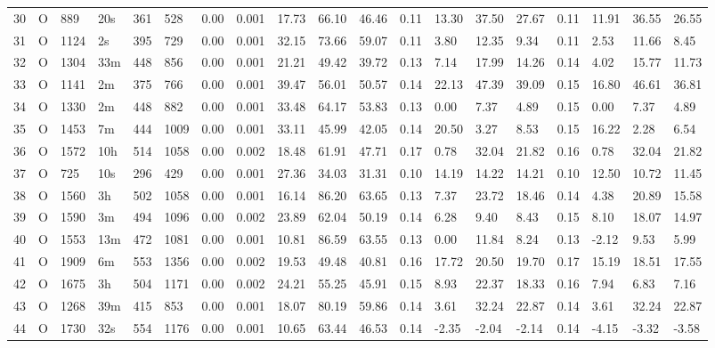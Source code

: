 \begin{tabular}{rllllllrlllllllllll}
30 & O & 889 & 20s & 361 & 528 & 0.00 & 0.001 & 17.73 & 66.10 & 46.46 & 0.11 & 13.30 & 37.50 & 27.67 & 0.11 & 11.91 & 36.55 & 26.55 \\
31 & O & 1124 & 2s & 395 & 729 & 0.00 & 0.001 & 32.15 & 73.66 & 59.07 & 0.11 & 3.80 & 12.35 & 9.34 & 0.11 & 2.53 & 11.66 & 8.45 \\
32 & O & 1304 & 33m & 448 & 856 & 0.00 & 0.001 & 21.21 & 49.42 & 39.72 & 0.13 & 7.14 & 17.99 & 14.26 & 0.14 & 4.02 & 15.77 & 11.73 \\
33 & O & 1141 & 2m & 375 & 766 & 0.00 & 0.001 & 39.47 & 56.01 & 50.57 & 0.14 & 22.13 & 47.39 & 39.09 & 0.15 & 16.80 & 46.61 & 36.81 \\
34 & O & 1330 & 2m & 448 & 882 & 0.00 & 0.001 & 33.48 & 64.17 & 53.83 & 0.13 & 0.00 & 7.37 & 4.89 & 0.15 & 0.00 & 7.37 & 4.89 \\
35 & O & 1453 & 7m & 444 & 1009 & 0.00 & 0.001 & 33.11 & 45.99 & 42.05 & 0.14 & 20.50 & 3.27 & 8.53 & 0.15 & 16.22 & 2.28 & 6.54 \\
36 & O & 1572 & 10h & 514 & 1058 & 0.00 & 0.002 & 18.48 & 61.91 & 47.71 & 0.17 & 0.78 & 32.04 & 21.82 & 0.16 & 0.78 & 32.04 & 21.82 \\
37 & O & 725 & 10s & 296 & 429 & 0.00 & 0.001 & 27.36 & 34.03 & 31.31 & 0.10 & 14.19 & 14.22 & 14.21 & 0.10 & 12.50 & 10.72 & 11.45 \\
38 & O & 1560 & 3h & 502 & 1058 & 0.00 & 0.001 & 16.14 & 86.20 & 63.65 & 0.13 & 7.37 & 23.72 & 18.46 & 0.14 & 4.38 & 20.89 & 15.58 \\
39 & O & 1590 & 3m & 494 & 1096 & 0.00 & 0.002 & 23.89 & 62.04 & 50.19 & 0.14 & 6.28 & 9.40 & 8.43 & 0.15 & 8.10 & 18.07 & 14.97 \\
40 & O & 1553 & 13m & 472 & 1081 & 0.00 & 0.001 & 10.81 & 86.59 & 63.55 & 0.13 & 0.00 & 11.84 & 8.24 & 0.13 & -2.12 & 9.53 & 5.99 \\
41 & O & 1909 & 6m & 553 & 1356 & 0.00 & 0.002 & 19.53 & 49.48 & 40.81 & 0.16 & 17.72 & 20.50 & 19.70 & 0.17 & 15.19 & 18.51 & 17.55 \\
42 & O & 1675 & 3h & 504 & 1171 & 0.00 & 0.002 & 24.21 & 55.25 & 45.91 & 0.15 & 8.93 & 22.37 & 18.33 & 0.16 & 7.94 & 6.83 & 7.16 \\
43 & O & 1268 & 39m & 415 & 853 & 0.00 & 0.001 & 18.07 & 80.19 & 59.86 & 0.14 & 3.61 & 32.24 & 22.87 & 0.14 & 3.61 & 32.24 & 22.87 \\
44 & O & 1730 & 32s & 554 & 1176 & 0.00 & 0.001 & 10.65 & 63.44 & 46.53 & 0.14 & -2.35 & -2.04 & -2.14 & 0.14 & -4.15 & -3.32 & -3.58 \\

\end{tabular}
